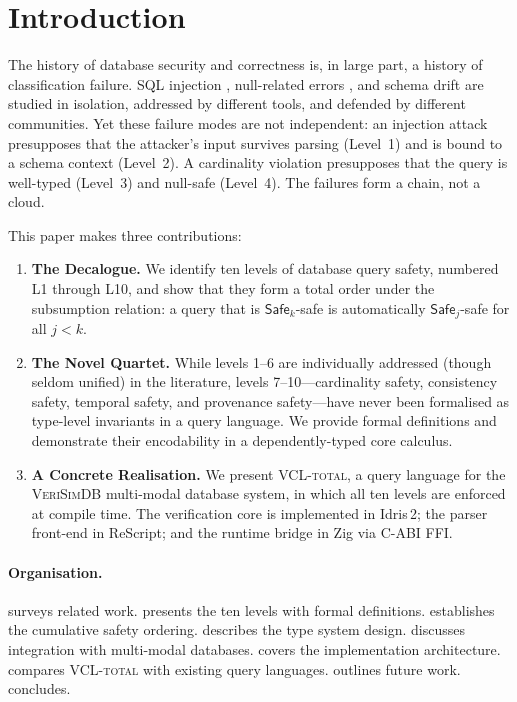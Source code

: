 \documentclass[11pt,a4paper]{article}
\newcommand{\VCL}{\textsc{VCL-total}}
\newcommand{\VeriSimDB}{\textsc{VeriSimDB}}
\newcommand{\LevelN}[1]{\textsf{L#1}}
\newcommand{\Safe}[1]{\ensuremath{\mathsf{Safe}_{#1}}}
\begin{document}
\section{Introduction}\label{sec:intro}

The history of database security and correctness is, in large part, a
history of classification failure.  SQL injection
\citep{halfond2006classification}, null-related errors
\citep{hoare2009null}, and schema drift
\citep{curino2008automating} are studied in isolation, addressed by
different tools, and defended by different communities.  Yet these
failure modes are not independent: an injection attack presupposes
that the attacker's input survives parsing (Level~1) and is bound to a
schema context (Level~2).  A cardinality violation presupposes that the
query is well-typed (Level~3) and null-safe (Level~4).  The failures
form a chain, not a cloud.

This paper makes three contributions:

\begin{enumerate}[label=(\roman*)]
  \item \textbf{The Decalogue.}  We identify ten levels of database
    query safety, numbered \LevelN{1} through \LevelN{10}, and show
    that they form a total order under the subsumption relation: a
    query that is \Safe{k}-safe is automatically \Safe{j}-safe for all
    $j < k$.

  \item \textbf{The Novel Quartet.}  While levels 1--6 are
    individually addressed (though seldom unified) in the literature,
    levels 7--10---cardinality safety, consistency safety, temporal
    safety, and provenance safety---have never been formalised as
    type-level invariants in a query language.  We provide formal
    definitions and demonstrate their encodability in a dependently-typed
    core calculus.

  \item \textbf{A Concrete Realisation.}  We present \VCL{}, a query
    language for the \VeriSimDB{} multi-modal database system, in which
    all ten levels are enforced at compile time.  The verification core
    is implemented in Idris\,2; the parser front-end in ReScript; and
    the runtime bridge in Zig via C-ABI FFI.
\end{enumerate}

\paragraph{Organisation.}
 surveys related work.
 presents the ten levels with formal definitions.
 establishes the cumulative safety ordering.
 describes the type system design.
 discusses integration with multi-modal databases.
 covers the implementation architecture.
 compares \VCL{} with existing query languages.
 outlines future work.
 concludes.
\end{document}
